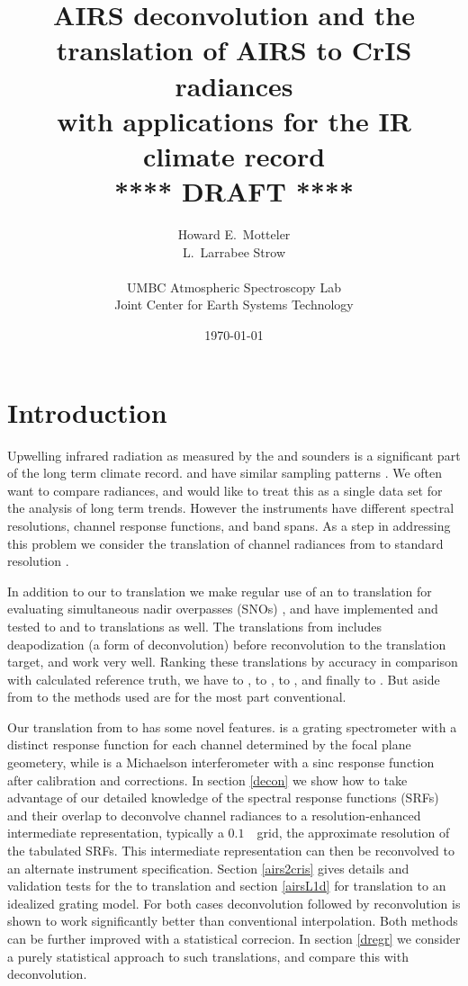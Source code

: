 \documentclass[10pt,twocolumn]{article}  %
\title{AIRS deconvolution and the \\
       translation of AIRS to CrIS radiances \\ 
       with applications for the IR climate record \\
  \vspace{3mm}
  {****} DRAFT {****}\\
}
\author{Howard E.~Motteler \\
  L.~Larrabee Strow \\
  \\
  UMBC Atmospheric Spectroscopy Lab \\
  Joint Center for Earth Systems Technology \\
}
\date{\today}
\begin{document}
\maketitle

\section{Introduction}

Upwelling infrared radiation as measured by the {\airs} \cite{airs1}
and {\cris} \cite{cris1,cris2} sounders is a significant part of the
long term climate record.  {\airs} and {\cris} have similar sampling
patterns \cite{git:acsamp}.  We often want to compare radiances, and
would like to treat this as a single data set for the analysis of
long term trends.  However the instruments have different spectral
resolutions, channel response functions, and band spans.  As a step
in addressing this problem we consider the translation of channel
radiances from {\airs} to standard resolution {\cris}.

In addition to our {\airs} to {\cris} translation we make regular
use of an {\iasi} to {\cris} translation for evaluating simultaneous
nadir overpasses (SNOs) \cite{sno1}, and have implemented and tested
{\iasi} to {\airs} and {\cris} to {\airs} translations as well.  The
translations from {\iasi} includes deapodization (a form of
deconvolution) before reconvolution to the translation target, and
work very well.  Ranking these translations by accuracy in
comparison with calculated reference truth, we have {\iasi} to
{\cris}, {\iasi} to {\airs}, {\airs} to {\cris}, and finally {\cris}
to {\airs} \cite{git:decon}.  But aside from {\airs} to {\cris} the
methods used are for the most part conventional.

Our translation from {\airs} to {\cris} has some novel features.
{\airs} is a grating spectrometer with a distinct response function
for each channel determined by the focal plane geometery, while
{\cris} is a Michaelson interferometer with a sinc response
function after calibration and corrections.  In section \ref{decon}
we show how to take advantage of our detailed knowledge of the
{\airs} spectral response functions (SRFs) and their overlap to
deconvolve channel radiances to a resolution-enhanced intermediate
representation, typically a $0.1$~\wn\ grid, the approximate
resolution of the tabulated {\airs} SRFs.  
This intermediate representation can then be reconvolved to an
alternate instrument specification.  Section \ref{airs2cris} gives
details and validation tests for the {\airs} to {\cris} translation
and section \ref{airsL1d} for translation to an idealized grating
model.  For both cases deconvolution followed by reconvolution is
shown to work significantly better than conventional interpolation.
Both methods can be further improved with a statistical correcion.
In section \ref{dregr} we consider a purely statistical approach to
such translations, and compare this with deconvolution.
\end{document}
